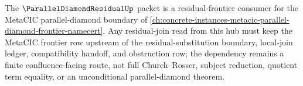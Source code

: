 The $\ParallelDiamondResidualUp$ packet is a residual-frontier consumer for the MetaCIC parallel-diamond boundary of \autoref{ch:concrete-instances-metacic-parallel-diamond-frontier-namecert}. Any residual-join read from this hub must keep the MetaCIC frontier row upstream of the residual-substitution boundary, local-join ledger, compatibility handoff, and obstruction row; the dependency remains a finite confluence-facing route, not full Church--Rosser, subject reduction, quotient term equality, or an unconditional parallel-diamond theorem.
